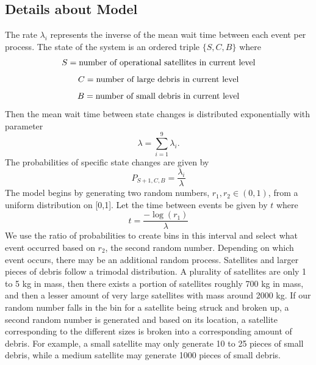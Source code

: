 \documentclass{article}
\theoremstyle{plain}			%
\theoremstyle{definition}		%
\theoremstyle{remark}
\numberwithin{equation}{section}
\numberwithin{figure}{section}
\numberwithin{table}{section}
\begin{document}
\subsection{Details about Model}
The rate $\lambda_i$ represents the inverse of the mean wait time between each event per process. The state of the system is an ordered triple $\{S,C,B\}$ where
$$ S = \textnormal{number of operational satellites in current level} $$
$$ C = \textnormal{number of large debris in current level} $$
$$ B = \textnormal{number of small debris in current level} $$
Then the mean wait time between state changes is distributed exponentially with parameter 
$$
\lambda = \sum_{i = 1}^9 \lambda_i.
$$ 
The probabilities of specific state changes are
given by
$$ P_{S+1,C,B}  = \dfrac{\lambda_i}{\lambda}$$
The model begins by generating two random numbers, $r_1,r_2\in (0,1)$, from a uniform distribution on [0,1]. Let the time between events be given by $t$ where
$$t=\dfrac{-\log(r_1)}{\lambda}$$
We use the ratio of probabilities to create bins in this interval and select what event occurred based on $r_2$, the second random number. Depending on which event occurs, there may be an additional random process. Satellites and larger pieces of debris follow a trimodal distribution. A plurality of satellites are only 1 to 5 kg in mass, then there exists a portion of satellites roughly 700 kg in mass, and then a lesser amount of very large satellites with mass around 2000 kg. If our random number falls in the bin for a satellite being struck and broken up, a second random number is generated and based on its
location, a satellite corresponding to the different sizes is broken into a corresponding amount of debris. For example, a small satellite may only generate 10 to 25 pieces of small debris, while a medium satellite may generate 1000 pieces of small debris. \\








\end{document}
